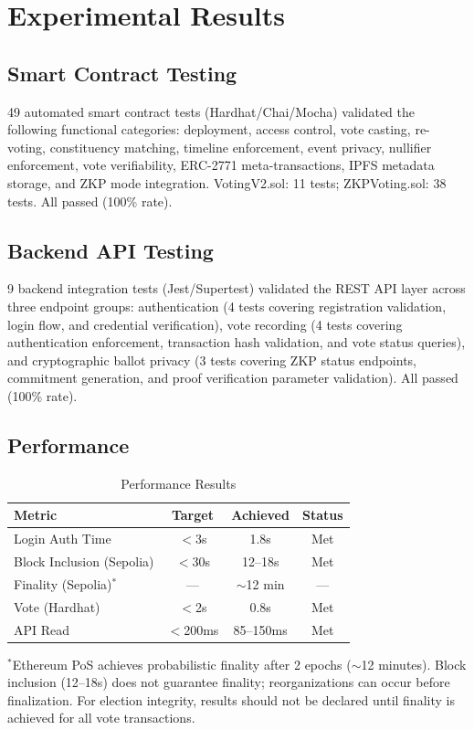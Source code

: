 \documentclass[conference]{IEEEtran}
\begin{document}
\section{Experimental Results}

\subsection{Smart Contract Testing}
49 automated smart contract tests (Hardhat/Chai/Mocha) validated the following functional categories: deployment, access control, vote casting, re-voting, constituency matching, timeline enforcement, event privacy, nullifier enforcement, vote verifiability, ERC-2771 meta-transactions, IPFS metadata storage, and ZKP mode integration. VotingV2.sol: 11 tests; ZKPVoting.sol: 38 tests. All passed (100\% rate).

\subsection{Backend API Testing}
9 backend integration tests (Jest/Supertest) validated the REST API layer across three endpoint groups: authentication (4 tests covering registration validation, login flow, and credential verification), vote recording (4 tests covering authentication enforcement, transaction hash validation, and vote status queries), and cryptographic ballot privacy (3 tests covering ZKP status endpoints, commitment generation, and proof verification parameter validation). All passed (100\% rate).

\subsection{Performance}
\begin{table}[htbp]
\centering
\caption{Performance Results}
\label{tab:performance}
\renewcommand{\arraystretch}{1.15}
\scriptsize
\begin{tabular}{|p{2.5cm}|c|c|c|}
\hline
\textbf{Metric} & \textbf{Target} & \textbf{Achieved} & \textbf{Status} \\
\hline
Login Auth Time & $<$3s & 1.8s & Met \\
\hline
Block Inclusion (Sepolia) & $<$30s & 12--18s & Met \\
\hline
Finality (Sepolia)$^*$ & --- & $\sim$12 min & --- \\
\hline
Vote (Hardhat) & $<$2s & 0.8s & Met \\
\hline
API Read & $<$200ms & 85--150ms & Met \\
\hline
\end{tabular}

\vspace{2pt}
\scriptsize{$^*$Ethereum PoS achieves probabilistic finality after 2 epochs ($\sim$12 minutes). Block inclusion (12--18s) does not guarantee finality; reorganizations can occur before finalization. For election integrity, results should not be declared until finality is achieved for all vote transactions.}
\end{table}
\end{document}
